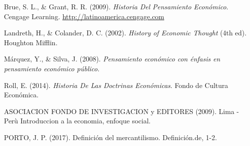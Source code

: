 \documentclass[
  jou,
  floatsintext,
  longtable,
  a4paper,
  nolmodern,
  notxfonts,
  notimes,
  colorlinks=true,linkcolor=blue,citecolor=blue,urlcolor=blue]{apa7}
\newlength{\cslhangindent}
\newenvironment{CSLReferences}[2] %
 {\begin{list}{}{%
  \setlength{\itemindent}{0pt}
  \setlength{\leftmargin}{0pt}
  \setlength{\parsep}{0pt}
  \ifodd #1
   \setlength{\leftmargin}{\cslhangindent}
   \setlength{\itemindent}{-1\cslhangindent}
  \fi
  \setlength{\itemsep}{#2\baselineskip}}}
 {\end{list}}
\begin{document}
\label{refs}
\begin{CSLReferences}{1}{0}
Brue, S. L., \& Grant, R. R. (2009). \emph{Historia {Del Pensamiento
Económico}}. Cengage Learning. \url{http://latinoamerica.cengage.com}

Landreth, H., \& Colander, D. C. (2002). \emph{History of Economic
Thought} (4th ed). Houghton Mifflin.

Márquez, Y., \& Silva, J. (2008). \emph{‪Pensamiento económico con
énfasis en pensamiento económico público‬}.

Roll, E. (2014). \emph{Historia De Las Doctrinas Económicas}. Fondo de
Cultura Económica.

\end{CSLReferences}

ASOCIACION FONDO DE INVESTIGACION y EDITORES (2009). Lima - Perù
\hspace{0pt}Introduccion a la economia, enfoque social.

PORTO, J. P. (2017). Definición del mercantilismo. Definición.de, 1-2.
\end{document}
